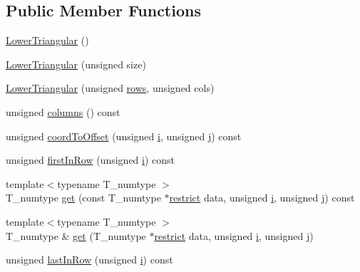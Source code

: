 \subsection*{Public Member Functions}
\begin{DoxyCompactItemize}
\item 
\hyperlink{classLowerTriangular_af8e9f2c82a2537e00a6eb9de2862c45c}{Lower\+Triangular} ()
\item 
\hyperlink{classLowerTriangular_ad0c3022864d17d66578ed5c7c1cf39a5}{Lower\+Triangular} (unsigned size)
\item 
\hyperlink{classLowerTriangular_ae299ce49cf7a1b1b2f0331cded54a074}{Lower\+Triangular} (unsigned \hyperlink{classLowerTriangular_a6836cbda5d17d0533b7e9a11212b6067}{rows}, unsigned cols)
\item 
unsigned \hyperlink{classLowerTriangular_a9c3aaffa3762dcc201f6ead3ee37cc75}{columns} () const 
\item 
unsigned \hyperlink{classLowerTriangular_ae86c6b501ea63695737ee421f73368b1}{coord\+To\+Offset} (unsigned \hyperlink{indexexpr_8h_aabd77643995707c185e95c8cb2782c81}{i}, unsigned \hyperlink{indexexpr_8h_aa1f3325d66516548e69238097857fa98}{j}) const 
\item 
unsigned \hyperlink{classLowerTriangular_af664460399b80c6f4b79a327c75d86cf}{first\+In\+Row} (unsigned \hyperlink{indexexpr_8h_aabd77643995707c185e95c8cb2782c81}{i}) const 
\item 
{\footnotesize template$<$typename T\+\_\+numtype $>$ }\\T\+\_\+numtype \hyperlink{classLowerTriangular_a92bd9a8b5e24a80a118f7a9784c253fb}{get} (const T\+\_\+numtype $\ast$\hyperlink{compiler_8h_a080abdcb9c02438f1cd2bb707af25af8}{restrict} data, unsigned \hyperlink{indexexpr_8h_aabd77643995707c185e95c8cb2782c81}{i}, unsigned \hyperlink{indexexpr_8h_aa1f3325d66516548e69238097857fa98}{j}) const 
\item 
{\footnotesize template$<$typename T\+\_\+numtype $>$ }\\T\+\_\+numtype \& \hyperlink{classLowerTriangular_a21d67c3050586a1589f13f69aa0d115e}{get} (T\+\_\+numtype $\ast$\hyperlink{compiler_8h_a080abdcb9c02438f1cd2bb707af25af8}{restrict} data, unsigned \hyperlink{indexexpr_8h_aabd77643995707c185e95c8cb2782c81}{i}, unsigned \hyperlink{indexexpr_8h_aa1f3325d66516548e69238097857fa98}{j})
\item 
unsigned \hyperlink{classLowerTriangular_a474fbf1ed788a5a1599e85b5694344f0}{last\+In\+Row} (unsigned \hyperlink{indexexpr_8h_aabd77643995707c185e95c8cb2782c81}{i}) const 

\end{DoxyCompactItemize}
